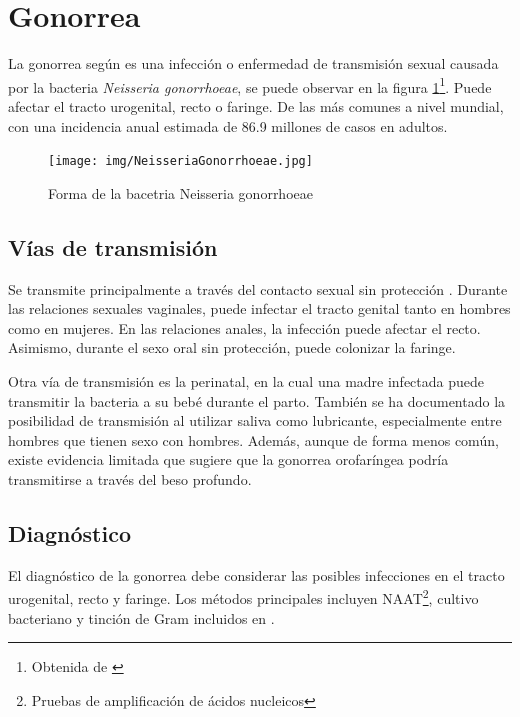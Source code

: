 \section{Gonorrea}
La gonorrea según \cite{unemo2019gonorrhoea} es una infección o enfermedad de transmisión sexual causada por la bacteria \textit{Neisseria gonorrhoeae}, se puede observar en la figura \ref{fig:Neisseria gonorrhoeae}\footnote{Obtenida de \cite{vircell_gonorrhoeae}}. Puede afectar el tracto urogenital, recto o faringe. De las más comunes a nivel mundial, con una incidencia anual estimada de 86.9 millones de casos en adultos.

\begin{figure}[H]
    \centering
    \texttt{[image: img/NeisseriaGonorrhoeae.jpg]}
    \caption{Forma de la bacetria Neisseria gonorrhoeae}
    \label{fig:Neisseria gonorrhoeae}
    \vspace{0.5cm} %
\end{figure}


\subsection{Vías de transmisión}
Se transmite principalmente a través del contacto sexual sin protección \cite{workowski2021sexually}. Durante las relaciones sexuales vaginales, puede infectar el tracto genital tanto en hombres como en mujeres. En las relaciones anales, la infección puede afectar el recto. Asimismo, durante el sexo oral sin protección, puede colonizar la faringe.

Otra vía de transmisión es la perinatal, en la cual una madre infectada puede transmitir la bacteria a su bebé durante el parto. También se ha documentado la posibilidad de transmisión al utilizar saliva como lubricante, especialmente entre hombres que tienen sexo con hombres. Además, aunque de forma menos común, existe evidencia limitada que sugiere que la gonorrea orofaríngea podría transmitirse a través del beso profundo.

\subsection{Diagnóstico}
El diagnóstico de la gonorrea debe considerar las posibles infecciones en el tracto urogenital, recto y faringe. Los métodos principales incluyen  NAAT\footnote{Pruebas de amplificación de ácidos nucleicos}, cultivo bacteriano y tinción de Gram incluidos en \cite{adamson2022diagnostic}.

